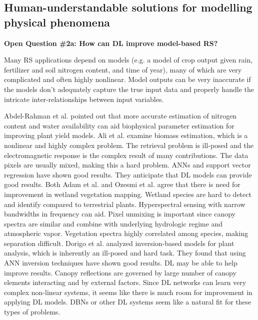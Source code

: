 \documentclass[12pt]{spieman}
\begin{document}
\begin{spacing}{1}
%
%
\subsection{Human-understandable solutions for modelling physical phenomena}
\label{subsec:ChallengesOpportunities_ii}
\textbf{Open Question \#2a: How can DL improve model-based RS?} 

Many RS applications depend on models (e.g. a model of crop output given rain, fertilizer and soil nitrogen content, and time of year), many of which are very complicated and often highly nonlinear. Model outputs can be very inaccurate if the models don't adequately capture the true input data and properly handle the intricate inter-relationships between input variables.

Abdel-Rahman et al. \cite{abdel2008application} pointed out that more accurate estimation of nitrogen content and water availability can aid biophysical parameter estimation for improving plant yield models. Ali et al. \cite{Ali201Review} examine biomass estimation, which is a nonlinear and highly complex problem. The retrieval problem is ill-posed and the electromagnetic response is the complex result of many contributions. The data pixels are usually mixed, making this a hard problem. ANNs and support vector regression have shown good results. They anticipate that DL models can provide good results. Both Adam et al. \cite{Adam2010MultiSpectral} and Ozesmi et al. \cite{ozesmi2002satellite} agree that there is need for improvement in wetland vegetation mapping. Wetland species are hard to detect and identify compared to terrestrial plants. Hyperspectral sensing with narrow bandwidths in frequency can aid. Pixel unmixing is important since canopy spectra are similar and combine with underlying hydrologic regime and atmospheric vapor. Vegetation spectra highly correlated among species, making separation difficult. Dorigo et al. \cite{dorigo2007review} analyzed inversion-based models for plant analysis, which is inherently an ill-posed and hard task. They found that using ANN inversion techniques have shown good results. DL may be able to help improve results. Canopy reflections are governed by large number of canopy elements interacting and by external factors. Since DL networks can learn very complex non-linear systems, it seems like there is much room for improvement in applying DL models. DBNs or other DL systems seem like a natural fit for these types of problems.


\end{spacing}
\end{document}
